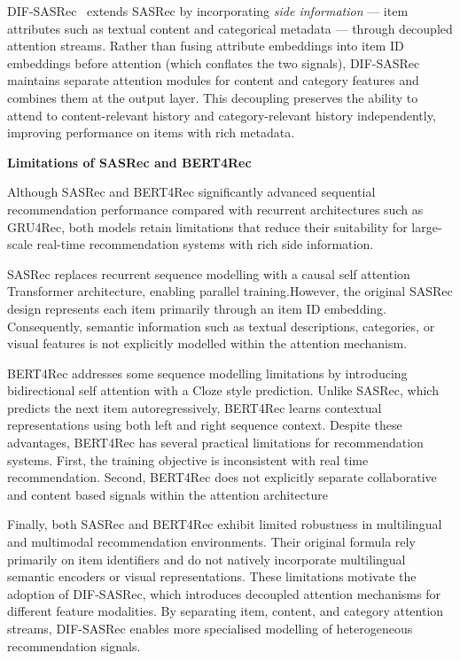 DIF-SASRec~\cite{xie2022difsasrec} extends SASRec by incorporating \textit{side information} — item attributes such as textual content and categorical metadata — through decoupled attention streams.
Rather than fusing attribute embeddings into item ID embeddings before attention (which conflates the two signals), DIF-SASRec maintains separate attention modules for content and category features and combines them at the output layer.
This decoupling preserves the ability to attend to content-relevant history and category-relevant history independently, improving performance on items with rich metadata.


\medskip
\noindent\textbf{Limitations of SASRec and BERT4Rec}


Although SASRec and BERT4Rec significantly advanced sequential recommendation performance compared with recurrent architectures such as GRU4Rec, both models retain limitations that reduce their suitability for large-scale real-time recommendation systems with rich side information.

SASRec replaces recurrent sequence modelling with a causal self attention Transformer architecture, enabling parallel training.However, the original SASRec design represents each item primarily through an item ID embedding. Consequently, semantic information such as textual descriptions, categories, or visual features is not explicitly modelled within the attention mechanism.

BERT4Rec addresses some sequence modelling limitations by introducing bidirectional self attention with a Cloze style prediction. Unlike SASRec, which predicts the next item autoregressively, BERT4Rec learns contextual representations using both left and right sequence context. Despite these advantages, BERT4Rec has several practical limitations for recommendation systems. First, the training objective is inconsistent with real time  recommendation. Second, BERT4Rec does not explicitly separate collaborative and content based signals within the attention architecture

Finally, both SASRec and BERT4Rec exhibit limited robustness in multilingual and multimodal recommendation environments. Their original formula rely primarily on item identifiers and do not natively incorporate multilingual semantic encoders or visual representations. These limitations motivate the adoption of DIF-SASRec, which introduces decoupled attention mechanisms for different feature modalities. By separating item, content, and category attention streams, DIF-SASRec enables more specialised modelling of heterogeneous recommendation signals.

